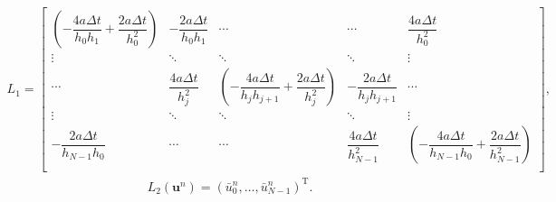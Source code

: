 \documentclass[a4paper, 11pt]{ctexart}
\numberwithin{equation}{section}
\numberwithin{figure}{section}
\newcommand\bu{\bm{u}}
\begin{document}
\begin{align}
  L_1=
  \begin{bmatrix}
    \left(-\dfrac{4a\Delta t}{h_0h_{1}}+\dfrac{2a\Delta t}{h_0^2}\right)
  & -\dfrac{2a\Delta t}{h_0h_{1}} & \cdots & \cdots & \dfrac{4a\Delta t}{h_0^2} \\
    \vdots & \ddots  & \ddots  & \ddots  & \vdots \\
  \cdots &\dfrac{4a\Delta t}{h_j^2} & \left(-\dfrac{4a\Delta t}{h_jh_{j+1}}+\dfrac{2a\Delta t}{h_j^2}\right)
  & -\dfrac{2a\Delta t}{h_jh_{j+1}} & \cdots \\
    \vdots & \ddots  & \ddots  & \ddots  & \vdots \\
    -\dfrac{2a\Delta t}{h_{N-1}h_{0}} & \cdots & \cdots &\dfrac{4a\Delta
    t}{h_{N-1}^2} & \left(-\dfrac{4a\Delta t}{h_{N-1}h_{0}}+\dfrac{2a\Delta
    t}{h_{N-1}^2}\right)
   \\
  \end{bmatrix},
\end{align}
\begin{align}
  L_2(\bu^n)=(\bar{u}^n_0,\dots, \bar{u}^n_{N-1})^\mathrm{T}.
\end{align}
\end{document}
